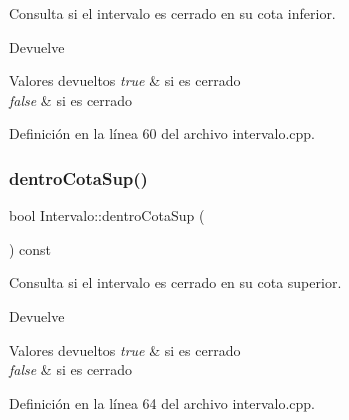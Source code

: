 Consulta si el intervalo es cerrado en su cota inferior. 

\begin{DoxyReturn}{Devuelve}

\end{DoxyReturn}

\begin{DoxyRetVals}{Valores devueltos}
{\em true} & si es cerrado\\
\hline
{\em false} & si es cerrado \\
\hline
\end{DoxyRetVals}


Definición en la línea 60 del archivo intervalo.\+cpp.


\begin{DoxyCode}{0}

\end{DoxyCode}
\mbox{\label{classIntervalo_aed0964a68d4b727bd104f5128ee7a7ef}} 
\subsubsection{\texorpdfstring{dentroCotaSup()}{dentroCotaSup()}}
{\footnotesize\ttfamily bool Intervalo\+::dentro\+Cota\+Sup (\begin{DoxyParamCaption}{ }\end{DoxyParamCaption}) const}



Consulta si el intervalo es cerrado en su cota superior. 

\begin{DoxyReturn}{Devuelve}

\end{DoxyReturn}

\begin{DoxyRetVals}{Valores devueltos}
{\em true} & si es cerrado\\
\hline
{\em false} & si es cerrado \\
\hline
\end{DoxyRetVals}


Definición en la línea 64 del archivo intervalo.\+cpp.


\begin{DoxyCode}{0}

\end{DoxyCode}
\mbox{\label{classIntervalo_a2cccd9264f1b3912c6006fe3e2a70289}} 

